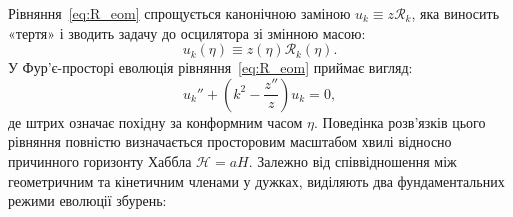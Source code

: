 Рівняння~\eqref{eq:R_eom} спрощується канонічною заміною
$u_k \equiv z\mathcal{R}_k$, яка виносить «тертя» і зводить
задачу до осцилятора зі змінною масою:
\begin{equation}\label{eq:u_definition}
  u_k(\eta) \equiv z(\eta) \mathcal{R}_k(\eta).
\end{equation}
У Фур'є-просторі еволюція рівняння~\eqref{eq:R_eom} приймає вигляд:
\begin{equation}\label{eq:R_eom_u}
  u_k'' + \left( k^2 - \frac{z''}{z} \right) u_k = 0,
\end{equation}
де штрих означає похідну за конформним часом $\eta$. Поведінка розв'язків цього рівняння повністю визначається просторовим масштабом хвилі відносно причинного горизонту Хаббла $\mathcal{H} = aH$. Залежно від співвідношення між геометричним та кінетичним членами у дужках, виділяють два фундаментальних режими еволюції збурень:

